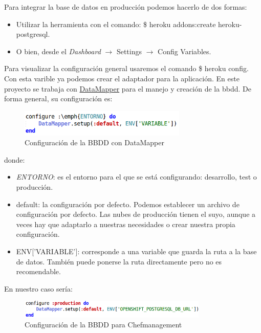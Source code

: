 Para integrar la base de datos en producción podemos hacerlo de dos formas:
\begin{itemize}
	\item Utilizar la herramienta con el comando: \$ heroku addons:create heroku-postgresql.
	\item O bien, desde el \emph{Dashboard} $\rightarrow$ Settings $\rightarrow$ Config Variables.
\end{itemize}

Para visualizar la configuración general usaremos el comando \$ heroku config. Con esta varible ya podemos crear el adaptador para la aplicación. En este proyecto se trabaja con \href{http://datamapper.org/}{DataMapper} para el manejo y creación de la bbdd. De forma general, su configuración es: \\

\begin{figure}[H]
	\centering
	\includegraphics[width=8cm]{./images/env01.png}
	\caption{Configuración de la BBDD con DataMapper} \label{fig:env01}
\end{figure}
 
 donde:
 \begin{itemize}
	 \item \emph{ENTORNO}: es el entorno para el que se está configurando: desarrollo, test o producción.
	\item default: la configuración por defecto. Podemos establecer un archivo de configuración por defecto. Las nubes de producción tienen el suyo, aunque a veces hay que adaptarlo a nuestras necesidades o crear nuestra propia configuración.
	\item ENV['VARIABLE']: corresponde a una variable que guarda la ruta a la base de datos. También puede ponerse la ruta directamente pero no es recomendable.
\end{itemize}

En nuestro caso sería: \\

\begin{figure}[H]
	\centering
	\includegraphics[width=9cm]{./images/env02.png}
	\caption{Configuración de la BBDD para Chefmanagement} \label{fig:env02}
\end{figure}

